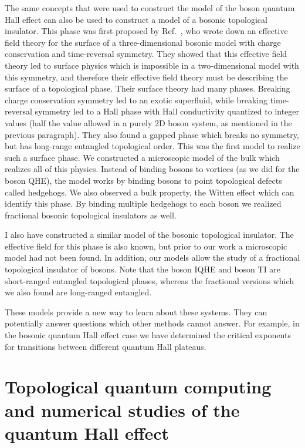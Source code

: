 The same concepts that were used to construct the model of the boson quantum Hall effect can also be used to construct a model of a bosonic topological insulator. 
This phase was first proposed by Ref.~\cite{VishwanathSenthil}, who wrote down an effective field theory for the surface of a three-dimensional bosonic model with charge conservation and time-reversal symmetry. They showed that this effective field theory led to surface physics which is impossible in a two-dimensional model with this symmetry, and therefore their effective field theory must be describing the surface of a topological phase. Their surface theory had many phases. Breaking charge conservation symmetry led to an exotic superfluid, while breaking time-reversal symmetry led to a Hall phase with Hall conductivity quantized to integer values (half the value allowed in a purely 2D boson system, as mentioned in the previous paragraph). They also found a gapped phase which breaks no symmetry, but has long-range entangled topological order. This was the first model to realize such a surface phase. We constructed a microscopic model of the bulk which realizes all of this physics. Instead of binding bosons to vortices (as we did for the boson QHE), the model works by binding bosons to point topological defects called hedgehogs. We also observed a bulk property, the Witten effect\cite{FranzWitten,Metlitski} which can identify this phase. By binding multiple hedgehogs to each boson we realized fractional bosonic topological insulators as well. 

I also have constructed a similar model of the bosonic topological insulator. The effective field for this phase is also known, but prior to our work a microscopic model had not been found. In addition, our models allow the study of a fractional topological insulator of bosons. Note that the boson IQHE and boson TI are short-ranged entangled topological phases, whereas the fractional versions which we also found are long-ranged entangled.

These models provide a new way to learn about these systems. They can potentially answer questions which other methods cannot answer. For example, in the bosonic quantum Hall effect case we have determined the critical exponents for transitions between different quantum Hall plateaus. 

\section{Topological quantum computing and numerical studies of the quantum Hall effect}

